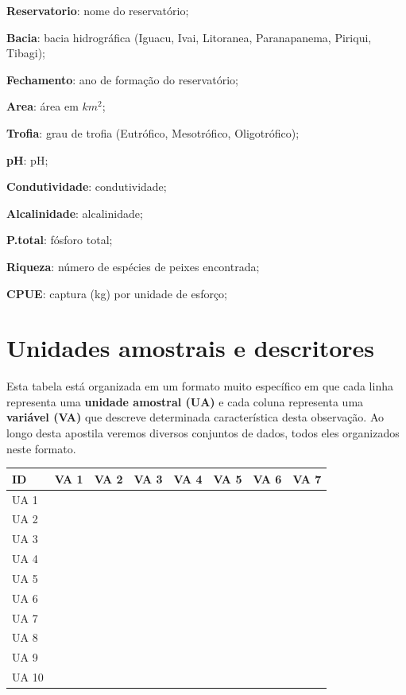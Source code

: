 \documentclass[
]{book}
\begin{document}
\textbf{Reservatorio}: nome do reservatório;

\textbf{Bacia}: bacia hidrográfica (Iguacu, Ivai, Litoranea, Paranapanema, Piriqui, Tibagi);

\textbf{Fechamento}: ano de formação do reservatório;

\textbf{Area}: área em \(km^2\);

\textbf{Trofia}: grau de trofia (Eutrófico, Mesotrófico, Oligotrófico);

\textbf{pH}: pH;

\textbf{Condutividade}: condutividade;

\textbf{Alcalinidade}: alcalinidade;

\textbf{P.total}: fósforo total;

\textbf{Riqueza}: número de espécies de peixes encontrada;

\textbf{CPUE}: captura (kg) por unidade de esforço;

\hypertarget{unidades-amostrais-e-descritores}{%
\section{Unidades amostrais e descritores}\label{unidades-amostrais-e-descritores}}

Esta tabela está organizada em um formato muito específico em que cada linha representa uma \textbf{unidade amostral (UA)} e cada coluna representa uma \textbf{variável (VA)} que descreve determinada característica desta observação. Ao longo desta apostila veremos diversos conjuntos de dados, todos eles organizados neste formato.

\begin{table}
\centering\begingroup\fontsize{11}{13}\selectfont

\begin{tabular}{llllllll}
\toprule
ID & VA 1 & VA 2 & VA 3 & VA 4 & VA 5 & VA 6 & VA 7\\
\midrule
UA 1 &  &  &  &  &  &  & \\
UA 2 &  &  &  &  &  &  & \\
UA 3 &  &  &  &  &  &  & \\
UA 4 &  &  &  &  &  &  & \\
UA 5 &  &  &  &  &  &  & \\
\addlinespace
UA 6 &  &  &  &  &  &  & \\
UA 7 &  &  &  &  &  &  & \\
UA 8 &  &  &  &  &  &  & \\
UA 9 &  &  &  &  &  &  & \\
UA 10 &  &  &  &  &  &  & \\
\bottomrule
\end{tabular}
\endgroup{}
\end{table}
\end{document}
